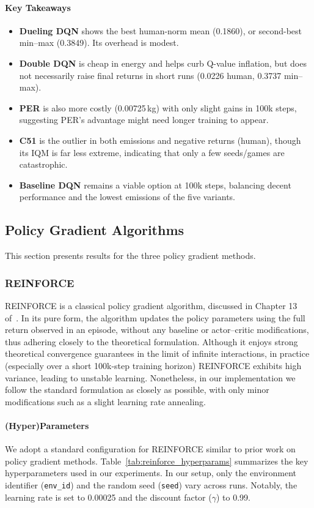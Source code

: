 \paragraph{Key Takeaways}
\begin{itemize}
	\item \textbf{Dueling DQN} shows the best human-norm mean (0.1860), 
	or second-best min--max (0.3849). Its overhead is modest.
	\item \textbf{Double DQN} is cheap in energy and helps curb Q-value inflation, 
	but does not necessarily raise final returns in short runs (0.0226 human, 0.3737 min--max).
	\item \textbf{PER} is also more costly (0.00725\,kg) with only slight gains in 100k steps, 
	suggesting PER’s advantage might need longer training to appear.
	\item \textbf{C51} is the outlier in both emissions and negative returns (human), 
	though its IQM is far less extreme, indicating that only a few seeds/games are catastrophic.
	\item \textbf{Baseline DQN} remains a viable option at 100k steps, 
	balancing decent performance and the lowest emissions of the five variants.
\end{itemize}


\subsection{Policy Gradient Algorithms}
This section presents results for the three policy gradient methods.

\subsubsection{REINFORCE}
\label{subsubsec:reinforce}
REINFORCE is a classical policy gradient algorithm, discussed in Chapter 13 of~\cite{sutton:rl}. In its pure form, the algorithm updates the policy parameters using the full return observed in an episode, without any baseline or actor–critic modifications, thus adhering closely to the theoretical formulation. Although it enjoys strong theoretical convergence guarantees in the limit of infinite interactions, in practice (especially over a short 100k-step training horizon) REINFORCE exhibits high variance, leading to unstable learning. Nonetheless, in our implementation we follow the standard formulation as closely as possible, with only minor modifications such as a slight learning rate annealing. 

\paragraph{(Hyper)Parameters}
We adopt a standard configuration for REINFORCE similar to prior work on policy gradient methods. Table~\ref{tab:reinforce_hyperparams} summarizes the key hyperparameters used in our experiments. In our setup, only the environment identifier (\texttt{env\_id}) and the random seed (\texttt{seed}) vary across runs. Notably, the learning rate is set to \num{0.00025} and the discount factor (\(\gamma\)) to \num{0.99}.

